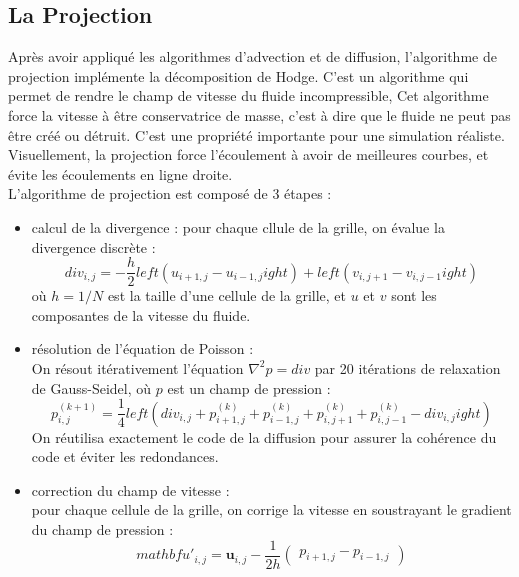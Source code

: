 \documentclass[a4paper]{article}
\begin{document}
\begin{enumerate}
{    }

    \subsection*{La Projection}
    {\color{red}Après avoir appliqué les algorithmes d'advection et de diffusion, l'algorithme de projection implémente la décomposition de Hodge. C'est un algorithme qui permet de rendre le champ de vitesse du fluide incompressible, 
    Cet algorithme force la vitesse à être conservatrice de masse, c'est à dire que le fluide ne peut pas être créé ou détruit. C'est une
    propriété importante pour une simulation réaliste. Visuellement, la projection force l'écoulement à avoir de meilleures courbes, et évite les écoulements en ligne droite. \\
    L'algorithme de projection est composé de 3 étapes :
    \begin{itemize}
        \item calcul de la divergence : pour chaque cllule de la grille, on évalue la divergence discrète :
        \begin{equation}
            {div}_{i,j} = -\frac{h}{2}left(u_{i+1,j} - u_{i-1,j}ight) + left(v_{i,j+1} - v_{i,j-1}ight)
        \end{equation}
        où $h = 1/N$ est la taille d'une cellule de la grille, et $u$ et $v$ sont les composantes de la vitesse du fluide.
        \item résolution de l'équation de Poisson : \\
        On résout itérativement l'équation $\nabla^2 p = div$ par 20 itérations de relaxation de Gauss-Seidel, où $p$ est un champ de pression :
        \begin{equation}
            p_{i,j}^{(k+1)} = \frac{1}{4}left({div}_{i,j} + p_{i+1,j}^{(k)} + p_{i-1,j}^{(k)} + p_{i,j+1}^{(k)} + p_{i,j-1}^{(k)} - div_{i,j}ight)
        \end{equation}
        On réutilisa exactement le code de la diffusion pour assurer la cohérence du code et éviter les redondances.
        \item correction du champ de vitesse : \\
        pour chaque cellule de la grille, on corrige la vitesse en soustrayant le gradient du champ de pression :
        \begin{equation}
            mathbf{u}'_{i,j} = \mathbf{u}_{i,j} - \frac{1}{2h} \begin{pmatrix} p_{i+1,j} - p_{i-1,j} \end{pmatrix}
        \end{equation}
    \end{itemize}}
    

\end{enumerate}
\end{document}
